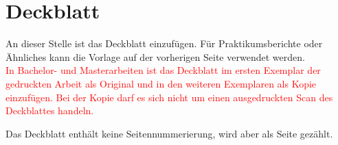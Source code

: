 \newpage


\chapter*{Deckblatt}

An dieser Stelle ist das Deckblatt einzufügen. Für Praktikumsberichte oder Ähnliches kann die Vorlage auf der vorherigen Seite verwendet werden.\\
\textcolor{red}{In Bachelor- und Masterarbeiten ist das Deckblatt im ersten Exemplar der gedruckten Arbeit als Original und in den weiteren Exemplaren als Kopie einzufügen. Bei der Kopie darf es sich nicht um einen ausgedruckten Scan des Deckblattes handeln.}

Das Deckblatt enthält keine Seitennummerierung, wird aber als Seite gezählt.

